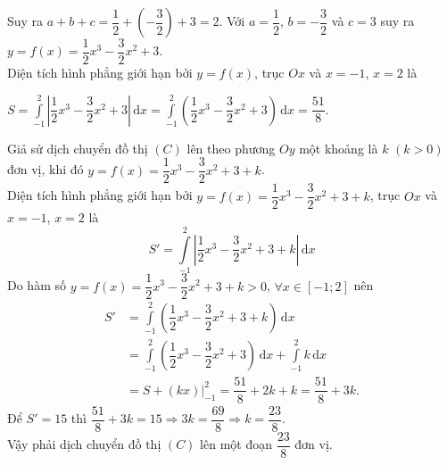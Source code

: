 \begin{ex}
{\begin{itemchoice}
\begin{center}
			\end{center}
			 Suy ra $a+b+c=\dfrac{1}{2}+\left( -\dfrac{3}{2} \right)+3=2$.
			\itemch Với $a=\dfrac{1}{2}$, $b=-\dfrac{3}{2}$ và $c=3$ suy ra $y=f\left( x \right)=\dfrac{1}{2}x^3-\dfrac{3}{2}x^2+3$.\\
			Diện tích hình phẳng giới hạn bởi $y=f\left( x \right)$, trục $Ox$ và $x=-1$, $x=2$ là
			\begin{center}
					$S=\displaystyle\int\limits_{-1}^2{\left| \dfrac{1}{2}x^3-\dfrac{3}{2}x^2+3 \right|\mathrm{\,d}x}=\displaystyle\int\limits_{-1}^2{\left( \dfrac{1}{2}x^3-\dfrac{3}{2}x^2+3 \right)\mathrm{\,d}x}=\dfrac{51}{8}$.
			\end{center}
		 	\itemch Giả sử dịch chuyển đồ thị $(C)$ lên theo phương $Oy$ một khoảng là $k$ $\left( k>0 \right)$ đơn vị, khi đó $y=f\left( x \right)=\dfrac{1}{2}x^3-\dfrac{3}{2}x^2+3+k$.\\
			Diện tích hình phẳng giới hạn bởi $y=f\left( x \right)=\dfrac{1}{2}x^3-\dfrac{3}{2}x^2+3+k$, trục $Ox$ và $x=-1$, $x=2$ là
			$$S'=\displaystyle\int\limits_{-1}^2{\left| \dfrac{1}{2}x^3-\dfrac{3}{2}x^2+3+k \right|\mathrm{\,d}x}$$
			Do hàm số $y=f\left( x \right)=\dfrac{1}{2}x^3-\dfrac{3}{2}x^2+3+k>0$, $\forall x\in \left[ -1;2 \right]$ nên
			\begin{align*}
				 S'&=\displaystyle\int\limits_{-1}^2\left(\dfrac{1}{2}x^3-\dfrac{3}{2}x^2+3+k \right)\mathrm{\,d}x\\
				 &=\displaystyle\int\limits_{-1}^2{\left( \dfrac{1}{2}x^3-\dfrac{3}{2}x^2+3 \right)\mathrm{\,d}x}+\displaystyle\int\limits_{-1}^2{k\mathrm{\,d}x}\\
				 &=S+\left(kx\right)\Big|_{-1}^2=\dfrac{51}{8}+2k+k=\dfrac{51}{8}+3k.
			\end{align*}
			Để $S'=15$ thì $\dfrac{51}{8}+3k=15\Rightarrow 3k=\dfrac{69}{8}\Rightarrow k=\dfrac{23}{8}$.\\
			Vậy phải dịch chuyển đồ thị $(C)$ lên một đoạn $\dfrac{23}{8}$ đơn vị.			
		\end{itemchoice}
	}
\end{ex}

